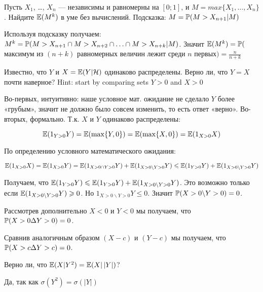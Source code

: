 \begin{problem}
Пусть $ X_{1} $, \ldots, $ X_{n} $ — независимы и равномерны на $ [0;1] $, и $ M=max\{X_{1},\ldots,X_{n}\} $. Найдите $\E(M^{k})$ в уме без вычислений. Подсказка: $ M=\P(M>X_{n+1}|M) $


\begin{sol}
Используя подсказку получаем: $ M^{k}=\P(M>X_{n+1} \cap M>X_{n+2} \cap \ldots \cap M>X_{n+k}|M) $. Значит $ \E(M^{k})=\P($максимум из $ (n+k) $ равномерных величин лежит среди $ n $ первых$)=\frac{n}{n+k} $
\end{sol}
\end{problem}

\begin{problem}
Известно, что $ Y $ и $ X=\E(Y|\mathcal{H}) $ одинаково распределены. Верно ли, что $ Y=X $ почти наверное? Hint: start by comparing sets $ Y>0 $ and $ X>0 $

\begin{sol}
Во-первых, интуитивно: наше условное мат. ожидание не сделало $ Y $ более «грубым», значит не должно было совсем изменить, то есть ответ «верно». Во-вторых, формально. Т.к. $ X $ и $ Y $ одинаково распределены:

\[ \E(1_{Y>0}Y)=\E(\max\{Y,0\})=\E(\max\{X,0\})=\E(1_{X>0}X) \]

По определению условного математического ожидания:

\[ \E(1_{X>0}X)=\E(1_{X>0}Y)=\E(1_{X>0\cap Y>0} Y)+\E(1_{X>0\backslash Y>0} Y)\leq \E(1_{ Y>0} Y)+\E(1_{X>0\backslash Y>0} Y)\]

Получаем, что $ \E(1_{Y>0}Y) \leq \E(1_{ Y>0} Y)+\E(1_{X>0\backslash Y>0} Y) $. Это возможно только если $ \E(1_{X>0\backslash Y>0} Y)\geq 0 $. Но $ 1_{X>0\backslash Y>0} Y \leq 0$. Значит $ \P(X>0 \backslash Y>0)=0 $.

Рассмотрев дополнительно $ X<0 $ и $ Y<0 $ мы получаем, что $ \P(X>0 \Delta Y>0)=0 $.

Сравнив аналогичным образом $ (X-c) $ и $ (Y-c) $ мы получаем, что $ \P(X>c \Delta Y>c)=0 $.


\end{sol}
\end{problem}

\begin{problem}
Верно ли, что $\E(X|Y^{2})=\E(X|\,|Y|)$?

\begin{sol}
Да, так как $\sigma(Y^{2})=\sigma(|Y|)$
\end{sol}
\end{problem}

